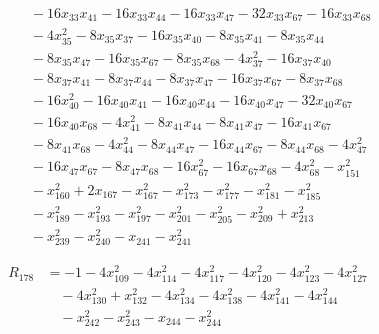 \begin{align*}
&\quad -16 x_{33} x_{41} -16 x_{33} x_{44} -16 x_{33} x_{47} -32 x_{33} x_{67} -16 x_{33} x_{68} \\
&\quad -4 x_{35}^{2} -8 x_{35} x_{37} -16 x_{35} x_{40} -8 x_{35} x_{41} -8 x_{35} x_{44} \\
&\quad -8 x_{35} x_{47} -16 x_{35} x_{67} -8 x_{35} x_{68} -4 x_{37}^{2} -16 x_{37} x_{40} \\
&\quad -8 x_{37} x_{41} -8 x_{37} x_{44} -8 x_{37} x_{47} -16 x_{37} x_{67} -8 x_{37} x_{68} \\
&\quad -16 x_{40}^{2} -16 x_{40} x_{41} -16 x_{40} x_{44} -16 x_{40} x_{47} -32 x_{40} x_{67} \\
&\quad -16 x_{40} x_{68} -4 x_{41}^{2} -8 x_{41} x_{44} -8 x_{41} x_{47} -16 x_{41} x_{67} \\
&\quad -8 x_{41} x_{68} -4 x_{44}^{2} -8 x_{44} x_{47} -16 x_{44} x_{67} -8 x_{44} x_{68} -4 x_{47}^{2} \\
&\quad -16 x_{47} x_{67} -8 x_{47} x_{68} -16 x_{67}^{2} -16 x_{67} x_{68} -4 x_{68}^{2} -x_{151}^{2} \\
&\quad -x_{160}^{2} +2 x_{167} -x_{167}^{2} -x_{173}^{2} -x_{177}^{2} -x_{181}^{2} -x_{185}^{2} \\
&\quad -x_{189}^{2} -x_{193}^{2} -x_{197}^{2} -x_{201}^{2} -x_{205}^{2} -x_{209}^{2} +x_{213}^{2} \\
&\quad -x_{239}^{2} -x_{240}^{2} -x_{241} -x_{241}^{2}
\end{align*}

\begin{align*}
R_{178} &= -1 -4 x_{109}^{2} -4 x_{114}^{2} -4 x_{117}^{2} -4 x_{120}^{2} -4 x_{123}^{2} -4 x_{127}^{2} \\
&\quad -4 x_{130}^{2} +x_{132}^{2} -4 x_{134}^{2} -4 x_{138}^{2} -4 x_{141}^{2} -4 x_{144}^{2} \\
&\quad -x_{242}^{2} -x_{243}^{2} -x_{244} -x_{244}^{2}
\end{align*}
